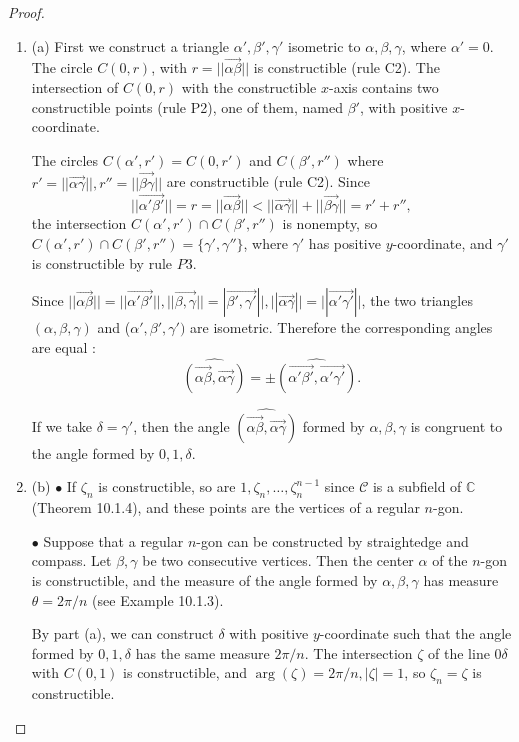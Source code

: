\documentclass[11pt,a4paper]{article}
\newcommand{\be} {\begin{enumerate}}
\newcommand{\ee} {\end{enumerate}}
\newcommand{\C}{\mathbb{C}}
\begin{document}
\begin{proof}
\be
\item[(a)] First we construct a triangle $\alpha',\beta',\gamma'$ isometric to $\alpha,\beta,\gamma$, where $\alpha' = 0$. The circle $C(0,r)$, with $r =||\overrightarrow{\alpha \beta}||$ is constructible (rule C2). The intersection of $C(0,r)$ with the constructible $x$-axis contains two constructible points (rule P2), one of them, named $\beta'$, with positive $x$-coordinate.

The circles $C(\alpha',r') = C(0,r')$ and $C(\beta',r'')$ where $r' = ||\overrightarrow{\alpha \gamma}||, r'' =  ||\overrightarrow{\beta \gamma}||$ are constructible (rule C2). Since 
$$||\overrightarrow{\alpha' \beta'}|| = r =  ||\overrightarrow{\alpha \beta}|| <  ||\overrightarrow{\alpha \gamma}|| + ||\overrightarrow{ \beta \gamma}|| = r' + r'',$$
the intersection $C(\alpha',r') \cap C(\beta',r'')$ is nonempty, so $C(\alpha',r') \cap C(\beta',r'') = \{\gamma', \gamma''\}$, where $\gamma'$ has positive $y$-coordinate, and $\gamma'$ is constructible by rule $P3$.

Since $||\overrightarrow{\alpha \beta}|| = ||\overrightarrow{\alpha' \beta'}||, ||\overrightarrow{ \beta, \gamma}|| =|\overrightarrow{\beta', \gamma'}||, ||\overrightarrow{\alpha \gamma}|| = ||\overrightarrow{\alpha' \gamma'}||$, the two triangles $(\alpha, \beta, \gamma)$ and ($\alpha', \beta', \gamma')$ are isometric. Therefore the corresponding angles are equal :
$$\widehat{(\overrightarrow{\alpha \beta}, \overrightarrow{\alpha \gamma})} = \pm \widehat{(\overrightarrow{\alpha' \beta'}, \overrightarrow{\alpha' \gamma'})}.$$

If we take $\delta = \gamma'$, then the angle $\widehat{(\overrightarrow{\alpha \beta}, \overrightarrow{\alpha \gamma})}$ formed by $\alpha, \beta, \gamma$ is congruent to the angle formed by $0,1,\delta$.
\item[(b)] $\bullet$ If $\zeta_n$ is constructible, so are $1,\zeta_n,\ldots, \zeta_n^{n-1}$ since $\mathscr{C}$ is a subfield of $\C$ (Theorem 10.1.4), and these points are the vertices of a regular $n$-gon.

$\bullet$ Suppose that a regular $n$-gon can be constructed by straightedge and compass. Let $\beta, \gamma$ be two consecutive vertices. Then the center $\alpha$ of the $n$-gon is constructible, and the measure of the angle formed by $\alpha, \beta,\gamma$ has measure $\theta = 2\pi/n$ (see Example 10.1.3).

By part (a), we can construct $\delta$ with positive $y$-coordinate such that the angle formed by $0,1,\delta$ has the same measure $2\pi/n$. The intersection $\zeta$ of the line $0\delta$ with $C(0,1)$ is constructible, and $\arg(\zeta) = 2\pi/n, |\zeta| = 1$, so $\zeta_n = \zeta$ is constructible.
\ee
\end{proof}
\end{document}
